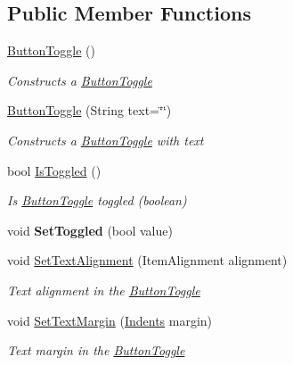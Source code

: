 \subsection*{Public Member Functions}
\begin{DoxyCompactItemize}
\item 
\mbox{\hyperlink{class_space_v_i_l_1_1_button_toggle_a9c9129ab9242dcaf0be502d94e2cfbe0}{Button\+Toggle}} ()
\begin{DoxyCompactList}\small\item\em Constructs a \mbox{\hyperlink{class_space_v_i_l_1_1_button_toggle}{Button\+Toggle}} \end{DoxyCompactList}\item 
\mbox{\hyperlink{class_space_v_i_l_1_1_button_toggle_a11b6a327297ca880c5cf1231ec0a4fcd}{Button\+Toggle}} (String text=\char`\"{}\char`\"{})
\begin{DoxyCompactList}\small\item\em Constructs a \mbox{\hyperlink{class_space_v_i_l_1_1_button_toggle}{Button\+Toggle}} with text \end{DoxyCompactList}\item 
bool \mbox{\hyperlink{class_space_v_i_l_1_1_button_toggle_acb981bafc054853c3c55d75f1602d157}{Is\+Toggled}} ()
\begin{DoxyCompactList}\small\item\em Is \mbox{\hyperlink{class_space_v_i_l_1_1_button_toggle}{Button\+Toggle}} toggled (boolean) \end{DoxyCompactList}\item 
\mbox{\label{class_space_v_i_l_1_1_button_toggle_a0a0ff9d276dae9744d4f544a4bf1d6bd}} 
void {\bfseries Set\+Toggled} (bool value)
\item 
void \mbox{\hyperlink{class_space_v_i_l_1_1_button_toggle_afdb8b34251a59d1268bdc23d91c4ee2b}{Set\+Text\+Alignment}} (Item\+Alignment alignment)
\begin{DoxyCompactList}\small\item\em Text alignment in the \mbox{\hyperlink{class_space_v_i_l_1_1_button_toggle}{Button\+Toggle}} \end{DoxyCompactList}\item 
void \mbox{\hyperlink{class_space_v_i_l_1_1_button_toggle_a387ba36cf18f799bbb64615e4925f160}{Set\+Text\+Margin}} (\mbox{\hyperlink{struct_space_v_i_l_1_1_decorations_1_1_indents}{Indents}} margin)
\begin{DoxyCompactList}\small\item\em Text margin in the \mbox{\hyperlink{class_space_v_i_l_1_1_button_toggle}{Button\+Toggle}} \end{DoxyCompactList}\item 

\end{DoxyCompactItemize}
